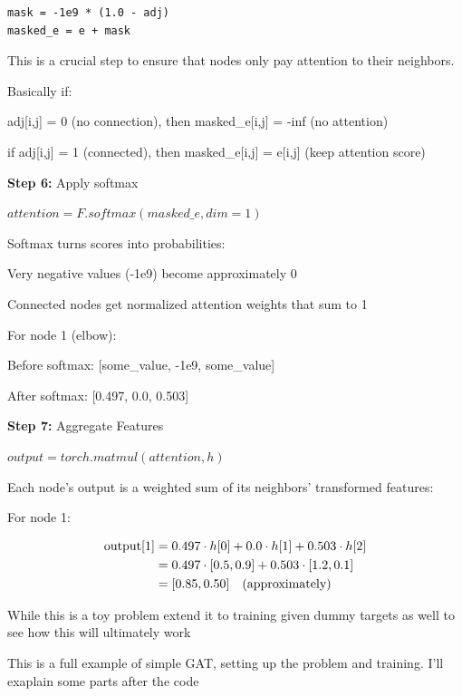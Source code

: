\begin{lstlisting}[style=pythonstyle,title={Toy problem forward pass step 5},label={code:toy_problem_forward_pass_step_5}]
mask = -1e9 * (1.0 - adj)
masked_e = e + mask
\end{lstlisting}

This is a crucial step to ensure that nodes only pay attention to their neighbors.

Basically if:

adj[i,j] = 0 (no connection), then masked\_e[i,j] = -inf (no attention)

if adj[i,j] = 1 (connected), then masked\_e[i,j] = e[i,j] (keep attention score)


\textbf{Step 6:} Apply softmax

$attention = F.softmax(masked\_e, dim=1)$

Softmax turns scores into probabilities:

Very negative values (-1e9) become approximately 0

Connected nodes get normalized attention weights that sum to 1

For node 1 (elbow):

Before softmax: [some\_value, -1e9, some\_value]

After softmax: [0.497, 0.0, 0.503]

\textbf{Step 7:} Aggregate Features

$output = torch.matmul(attention, h)$

Each node's output is a weighted sum of its neighbors' transformed features:

For node 1:

\begin{align}
\label{eq:gat_toy_output}
\text{output}[1] &= 0.497 \cdot h[0] + 0.0 \cdot h[1] + 0.503 \cdot h[2] \notag \\
                 &= 0.497 \cdot [0.5, 0.9] + 0.503 \cdot [1.2, 0.1] \notag \\
                 &= [0.85, 0.50] \quad \text{(approximately)}
\end{align}


While this is a toy problem extend it to training given dummy targets as well
to see how this will ultimately work

This is a full example of simple GAT, setting up the problem and training. I'll
exaplain some parts after the code

